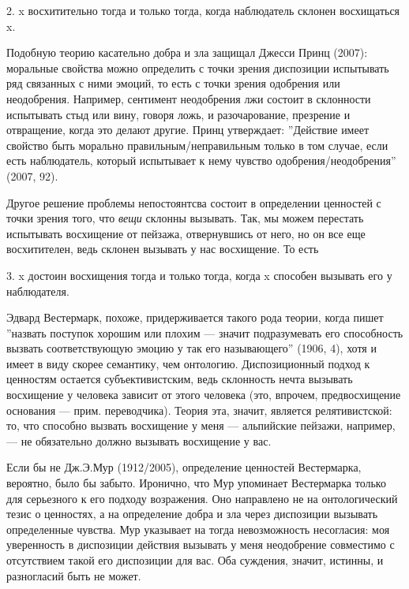 \documentclass[11pt]{book}
\begin{document}
\smallskip

2. x восхитительно тогда и только тогда, когда наблюдатель склонен восхищаться x.

\smallskip

Подобную теорию касательно добра и зла защищал Джесси Принц (2007): моральные свойства можно определить с точки зрения диспозиции испытывать ряд связанных с ними эмоций, то есть с точки зрения одобрения или неодобрения. Например, сентимент неодобрения лжи состоит в склонности испытывать стыд или вину, говоря ложь, и разочарование, презрение и отвращение, когда это делают другие. Принц утверждает: ''Действие имеет свойство быть морально правильным/неправильным только в том случае, если есть наблюдатель, который испытывает к нему чувство одобрения/неодобрения'' (2007, 92).

Другое решение проблемы непостоянтсва состоит в определении ценностей с точки зрения того, что \textit{вещи} склонны вызывать. Так, мы можем перестать испытывать восхищение от пейзажа, отвернувшись от него, но он все еще восхитителен, ведь склонен вызывать у нас восхищение. То есть

\smallskip

3. x достоин восхищения тогда и только тогда, когда x способен вызывать его у наблюдателя.

\smallskip

Эдвард Вестермарк, похоже, придерживается такого рода теории, когда пишет ''назвать поступок хорошим или плохим --- значит подразумевать его способность вызвать соответствующую эмоцию у так его называющего'' (1906, 4), хотя и имеет в виду скорее семантику, чем онтологию. Диспозиционный подход к ценностям остается субъективистским, ведь склонность нечта вызывать восхищение у человека зависит от этого человека (это, впрочем, предвосхищение основания --- прим. переводчика). Теория эта, значит, является релятивистской: то, что способно вызвать восхищение у меня --- альпийские пейзажи, например, --- не обязательно должно вызывать восхищение у вас.

Если бы не Дж.Э.Мур (1912/2005), определение ценностей Вестермарка, вероятно, было бы забыто. Иронично, что Мур упоминает Вестермарка только для серьезного к его подходу возражения. Оно направлено не на онтологический тезис о ценностях, а на определение добра и зла через диспозиции вызывать определенные чувства. Мур указывает на тогда невозможность несогласия: моя уверенность в диспозиции действия вызывать у меня неодобрение совместимо с отсутствием такой его диспозиции для вас. Оба суждения, значит, истинны, и разногласий быть не может.
\end{document}
